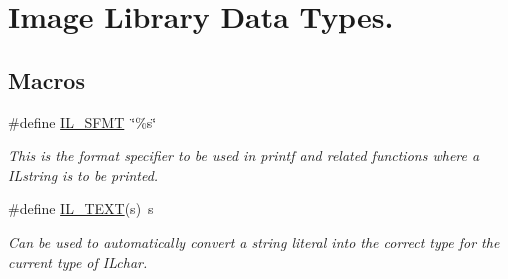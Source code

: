 \hypertarget{group__il__types}{\section{Image Library Data Types.}
\label{group__il__types}
}
\subsection*{Macros}
\begin{DoxyCompactItemize}
\item 
\hypertarget{group__il__types_gae9770f68c5226a227b5929f4b42eec18}{\#define \hyperlink{group__il__types_gae9770f68c5226a227b5929f4b42eec18}{I\+L\+\_\+\+S\+F\+M\+T}~\char`\"{}\%s\char`\"{}}\label{group__il__types_gae9770f68c5226a227b5929f4b42eec18}

\begin{DoxyCompactList}\small\item\em This is the format specifier to be used in {\itshape printf} and related functions where a I\+Lstring is to be printed. \end{DoxyCompactList}\item 
\hypertarget{group__il__types_ga2907c2129d2ba2ebbae6aa6a69b7f685}{\#define \hyperlink{group__il__types_ga2907c2129d2ba2ebbae6aa6a69b7f685}{I\+L\+\_\+\+T\+E\+X\+T}(s)~s}\label{group__il__types_ga2907c2129d2ba2ebbae6aa6a69b7f685}

\begin{DoxyCompactList}\small\item\em Can be used to automatically convert a string literal into the correct type for the current type of I\+Lchar. \end{DoxyCompactList}\end{DoxyCompactItemize}
